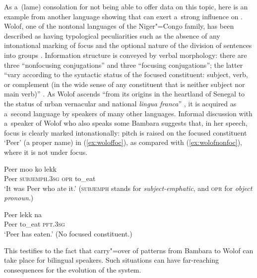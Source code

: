 As a~(lame) consolation for not being able to offer data on this topic, here is an example from another language showing that  can exert a~strong influence on . Wolof, one of the nontonal languages of the Niger"=Congo family, has been described as having typological peculiarities such as the absence of any intonational marking of focus and the optional nature of the division of sentences into  groups \citep{riallandetal2001}. Information structure is conveyed by verbal morphology: there are three “nonfocusing conjugations'' and three “focusing conjugations''; the latter “vary according to the syntactic status of the focused constituent: subject, verb, or complement (in the wide sense of any constituent that is neither subject nor main verb)'' \citep[895]{riallandetal2001}. As Wolof ascends “from its origins in the heartland of Senegal to the status of urban vernacular and national \textit{lingua franca}'' \citep[142]{mclaughlin2008}, it is acquired as a~second language by speakers of many other languages. Informal discussion with a~speaker of Wolof who also speaks some Bambara suggests that, in her speech, focus is clearly marked intonationally: pitch is raised on the focused constituent `Peer' (a proper name) in (\ref{ex:woloffoc}), as compared with (\ref{ex:wolofnonfoc}), where it is not under focus. 

{\largerpage}

\begin{exe}
	\ex
	\label{ex:woloffoc} %
	\gll {\dots} Peer moo ko lekk\\
	{} Peer \textsc{subjemph.3sg} \textsc{opr} to\_eat\\
	\glt ‘It was Peer who ate it.’ (\textsc{subjemph} stands for \textit{subject-emphatic}, and \textsc{opr} for \textit{object pronoun}.)
\end{exe}

\begin{exe}
	\ex
	\label{ex:wolofnonfoc} %
	\gll {\dots} Peer lekk na\\
	{} Peer to\_eat \textsc{pft.3sg}\\
	\glt ‘Peer has eaten.’ (No focused constituent.)
\end{exe}

This testifies to the fact that carry"=over of  patterns from Bambara to Wolof can take place for bilingual speakers. Such situations can have far-reaching consequences for the evolution of the  system.